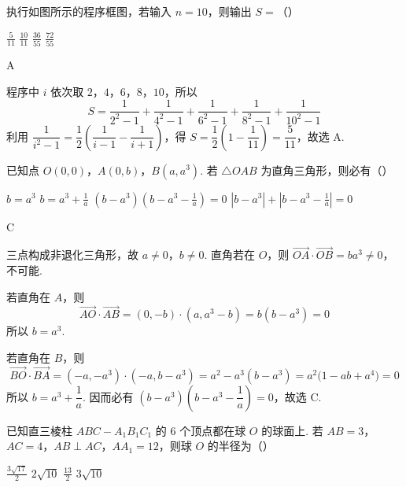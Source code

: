 \begin{problem}
执行如图所示的程序框图，若输入 \(n = 10\)，则输出 \(S =\)（\quad）


\choices
    {\(\frac{5}{11}\)}
    {\(\frac{10}{11}\)}
    {\(\frac{36}{55}\)}
    {\(\frac{72}{55}\)}
\end{problem}

\begin{answer}
A
\end{answer}

\begin{solution}
程序中 \(i\) 依次取 \(2\)，\(4\)，\(6\)，\(8\)，\(10\)，所以
\[
S=\frac1{2^2-1}+\frac1{4^2-1}+\frac1{6^2-1}+\frac1{8^2-1}+\frac1{10^2-1}
\]
利用 \(\dfrac1{i^2-1}=\dfrac12\left(\dfrac1{i-1}-\dfrac1{i+1}\right)\)，得
\(S=\dfrac12\left(1-\dfrac1{11}\right)=\dfrac5{11}\)，故选 A.
\end{solution}

\begin{problem}
已知点 \(O(0,0)\)，\(A(0,b)\)，\(B(a,a^{3})\). 若 \(\triangle OAB\) 为直角三角形，则必有（\quad）

\choices
    {\(b = a^{3}\)}
    {\(b = a^{3} + \frac{1}{a}\)}
    {\(\left(b - a^{3}\right)\left(b - a^{3} - \frac{1}{a}\right) = 0\)}
    {\(\left|b - a^3\right| + \left|b - a^3 - \frac{1}{a}\right| = 0\)}
\end{problem}

\begin{answer}
C
\end{answer}

\begin{solution}
三点构成非退化三角形，故 \(a\ne0\)，\(b\ne0\). 直角若在 \(O\)，则
\(\overrightarrow{OA}\cdot\overrightarrow{OB}=ba^3\ne0\)，不可能.

若直角在 \(A\)，则
\[
\overrightarrow{AO}\cdot\overrightarrow{AB}=(0,-b)\cdot(a,a^3-b)=b(b-a^3)=0
\]
所以 \(b=a^3\).

若直角在 \(B\)，则
\[
\overrightarrow{BO}\cdot\overrightarrow{BA}=(-a,-a^3)\cdot(-a,b-a^3)
=a^2-a^3(b-a^3)=a^2\bigl(1-ab+a^4\bigr)=0
\]
所以 \(b=a^3+\dfrac1a\). 因而必有
\(\left(b-a^3\right)\left(b-a^3-\dfrac1a\right)=0\)，故选 C.
\end{solution}

\begin{problem}
已知直三棱柱 \(ABC-A_1B_1C_1\) 的 \(6\) 个顶点都在球 \(O\) 的球面上. 若 \(AB = 3\)，\(AC = 4\)，\(AB \perp AC\)，\(AA_1 = 12\)，则球 \(O\) 的半径为（\quad）

\choices
    {\(\frac{3\sqrt{17}}{2}\)}
    {\(2\sqrt{10}\)}
    {\(\frac{13}{2}\)}
    {\(3\sqrt{10}\)}
\end{problem}

